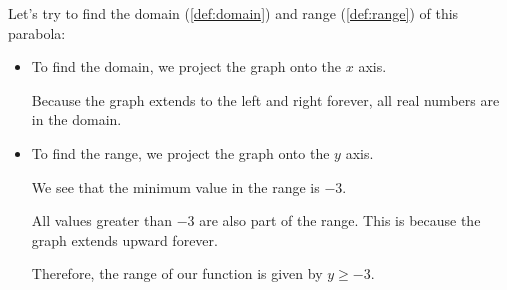 
Let's try to find the domain (\ref{def:domain}) and range (\ref{def:range}) of
this parabola:

\begin{figure}[htpb]
  \centering
  \label{fig:domain_of_parabola_start}
\end{figure}

\begin{itemize}
  \label{item:domain_and_range_of_parabola}

  \item To find the domain, we project the graph onto the $x$ axis.

    \begin{figure}[htpb]
      \centering
      \label{fig:domain_of_parabola_end}
    \end{figure}

    Because the graph extends to the left and right forever, all real numbers
    are in the domain.

  \item To find the range, we project the graph onto the $y$ axis.

    \begin{figure}[htpb]
      \centering
      \label{fig:range_of_parabola_end}
    \end{figure}

    We see that the minimum value in the range is $-3$.

    All values greater than $-3$ are also part of the range. This is because the
    graph extends upward forever.

    Therefore, the range of our function is given by $y \ge -3$.
\end{itemize}

\newpage
